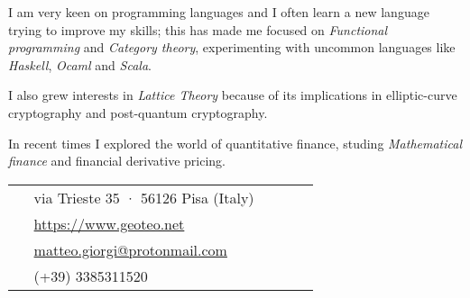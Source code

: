 \documentclass[10pt]{article} %
\begin{document}
\begin{paracol}{2}
I am very keen on programming languages and I often learn a new language trying to improve my skills; this has made me focused on \textit{Functional programming} and \textit{Category theory}, experimenting with uncommon languages like \textit{Haskell}, \textit{Ocaml} and \textit{Scala}.

\medskip
I also grew interests in \textit{Lattice Theory} because of its implications in elliptic-curve cryptography and post-quantum cryptography.

\medskip
In recent times I explored the world of quantitative finance, studing \textit{Mathematical finance} and financial derivative pricing.





\switchcolumn %


\parbox[top][0.12\textheight][c]{\linewidth}{ %
	\vspace{-0.04\textheight} %
	\colorbox{shade}{ %
		\begin{supertabular}{p{0.05\linewidth}|p{0.775\linewidth}} %
			\raisebox{-1pt}{\faHome} & via Trieste 35 · 56126 Pisa (Italy) \\ %
			\raisebox{-1pt}{\small\faDesktop} & \href{https://www.geoteo.net}{https://www.geoteo.net} \\ %
			\raisebox{0pt}{\small\faEnvelope} & \href{mailto:matteo.giorgi@protonmail.com}{matteo.giorgi@protonmail.com} \\ %
			\raisebox{-1pt}{\faPhoneSquare} & (+39) 3385311520 \\ %
		\end{supertabular}
	}
}


\end{paracol}
\end{document}
